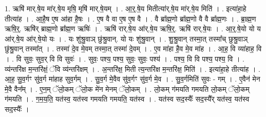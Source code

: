 \documentclass[17pt]{extarticle}
\begin{document}
1. ऋषि॑ मार्.षे॒य मा॑र्.षे॒य मृषि॒ मृषि॑ मार्.षे॒यम् । . आ॒र्॒.षे॒य मितीत्या॑र्.षे॒य मा॑र्.षे॒य मिति॑ । . इत्या॑हा॒हे तीत्या॑ह । . आ॒है॒ष ए॒ष आ॑हा है॒षः । . ए॒ष वै वा ए॒ष ए॒ष वै । . वै ब्रा᳚ह्म॒णो ब्रा᳚ह्म॒णो वै वै ब्रा᳚ह्म॒णः । . ब्रा॒ह्म॒ण ऋषि॒र्॒. ऋषि॑र् ब्राह्म॒णो ब्रा᳚ह्म॒ण ऋषिः॑ । . ऋषि॑ रार्.षे॒य आ॑र्.षे॒य ऋषि॒र्॒. ऋषि॑ रार्.षे॒यः । . आ॒र्॒.षे॒यो यो य आ॑र्.षे॒य आ॑र्.षे॒यो यः । . यः शु॑श्रु॒वाञ् छु॑श्रु॒वान्. यो यः शु॑श्रु॒वान् । . शु॒श्रु॒वान् तस्मा॒त् तस्मा᳚च् छुश्रु॒वाञ् छु॑श्रु॒वान् तस्मा᳚त् । . तस्मा॑ दे॒व मे॒वम् तस्मा॒त् तस्मा॑ दे॒वम् । . ए॒व मा॑हा है॒व मे॒व मा॑ह । . आ॒ह॒ वि व्या॑हाह॒ वि । . वि सुवः॒ सुव॒र् वि वि सुवः॑ । . सुवः॒ पश्य॒ पश्य॒ सुवः॒ सुवः॒ पश्य॑ । . पश्य॒ वि वि पश्य॒ पश्य॒ वि । . व्य॑न्तरि॑क्ष म॒न्तरि॑क्षं॒ ॅवि व्य॑न्तरि॑क्षम् । . अ॒न्तरि॑क्ष॒ मिती त्य॒न्तरि॑क्ष म॒न्तरि॑क्ष॒ मिति॑ । . इत्या॑हा॒हे तीत्या॑ह । . आ॒ह॒ सु॒व॒र्गꣳ सु॑व॒र्ग मा॑हाह सुव॒र्गम् । . सु॒व॒र्ग मे॒वैव सु॑व॒र्गꣳ सु॑व॒र्ग मे॒व । . सु॒व॒र्गमिति॑ सुवः - गम् । . ए॒वैन॑ मेन मे॒वै वैन᳚म् । . ए॒न॒म् ॅलो॒कम् ॅलो॒क मे॑न मेनम् ॅलो॒कम् । . लो॒कम् ग॑मयति गमयति लो॒कम् ॅलो॒कम् ग॑मयति । . ग॒म॒य॒ति॒ यत॑स्व॒ यत॑स्व गमयति गमयति॒ यत॑स्व । . यत॑स्व सद॒स्यैः᳚ सद॒स्यै᳚र् यत॑स्व॒ यत॑स्व सद॒स्यैः᳚ । \newline
\end{document}
